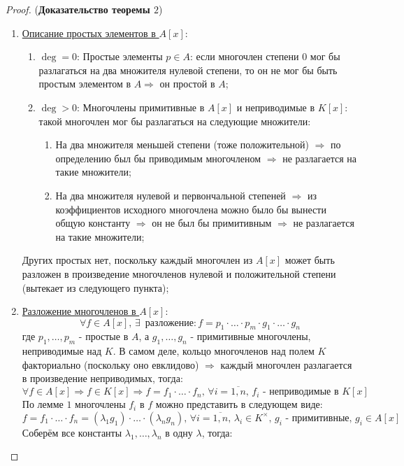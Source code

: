 \documentclass[12pt]{article}
\theoremstyle{definition}
\newcommand{\ovl}[1]{\overline{#1}}
\begin{document}
\begin{proof}(\textbf{Доказательство теоремы $2$})
	\begin{enumerate}[label=\arabic*)]
		\item \uline{Описание простых элементов в $A[x]$}:
		\begin{enumerate}[label=(\arabic*)]
			\item $\deg = 0$: Простые элементы $p \in A$: если многочлен степени $0$ мог бы разлагаться на два множителя нулевой степени, то он не мог бы быть простым элементом в $A \Rightarrow$ он простой в $A$; 
			\item $\deg > 0$: Многочлены примитивные в $A[x]$ и неприводимые в $K[x]$: такой многочлен мог бы разлагаться на следующие множители:
			\begin{enumerate}[label=\alph*)]
				\item На два множителя меньшей степени (тоже положительной) $\Rightarrow$ по определению был бы приводимым многочленом $\Rightarrow$ не разлагается на такие множители;
				\item На два множителя нулевой и первончальной степеней $\Rightarrow$ из коэффициентов исходного многочлена можно было бы вынести общую константу $\Rightarrow$ он не был бы примитивным $\Rightarrow$ не разлагается на такие множители;  
			\end{enumerate}
		\end{enumerate}
		Других простых нет, поскольку каждый многочлен из $A[x]$ может быть разложен в произведение многочленов нулевой и положительной степени (вытекает из следующего пункта);
		\item \uline{Разложение многочленов в $A[x]$}:
		$$
			\forall f \in A[x], \, \exists\, \text{ разложение} \colon f = p_1{\cdot}\dotsc{\cdot}p_m{\cdot}g_1{\cdot}\dotsc{\cdot}g_n
		$$
		где $p_1, \dotsc, p_m$ - простые в $A$, а $g_1,\dotsc, g_n$ - примитивные многочлены, неприводимые над $K$. В самом деле, кольцо многочленов над полем $K$ факториально (поскольку оно евклидово) $\Rightarrow$ каждый многочлен разлагается в произведение неприводимых, тогда:
		$$
			\forall f \in A[x] \Rightarrow f \in K[x] \Rightarrow f = f_1{\cdot}\dotsc{\cdot}f_n, \, \forall i = \ovl{1,n}, \, f_i \text{ - неприводимые в } K[x]
		$$
		По лемме $1$ многочлены $f_i$ в $f$ можно представить в следующем виде:
		$$
			f = f_1{\cdot}\dotsc{\cdot}f_n = (\lambda_1g_1){\cdot}\dotsc{\cdot}(\lambda_ng_n), \, \forall i =\ovl{1,n}, \, \lambda_i \in K^{\times}, \, g_i\text{ - примитивные}, \, g_i \in A[x]
		$$
		Соберём все константы $\lambda_1,\dotsc,\lambda_n$ в одну $\lambda$, тогда:

\end{enumerate}
\end{proof}
\end{document}
